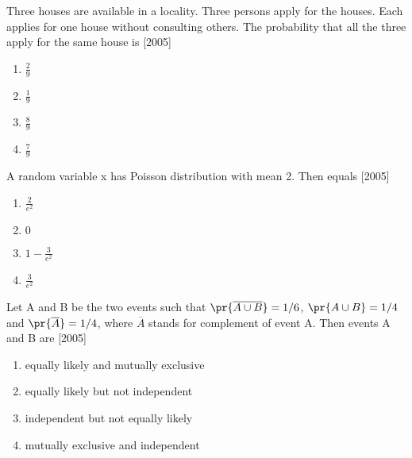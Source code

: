             \item Three houses are available in a locality. Three persons apply for the houses. Each applies for one house without consulting others. The probability that all the three apply for the same house is  \hfill [2005]

        \begin{multicols}{4}
        \begin{enumerate}
            \item $\frac{2}{9}$
            \item $\frac{1}{9}$
            \item $\frac{8}{9}$
            \item $\frac{7}{9}$   
        \end{enumerate}
        \end{multicols}



            \item A random variable x has Poisson distribution with mean 2. Then  equals \hfill [2005]

        \begin{multicols}{4}
        \begin{enumerate}
            \item $\frac{2}{e^2}$
            \item $0$
            \item $1 - \frac{3}{e^2}$
            \item $\frac{3}{e^2}$   
        \end{enumerate}
        \end{multicols}

        
            \item Let A and B be the two events such that $\pr{\overline{A \cup B}} = 1/6$, $\pr{A \cup B} = 1/4$ and $\pr{\overline{A}} = 1/4$, where $\overline{A}$ stands for complement of event A. Then events A and B are     \hfill [2005]

        
        \begin{enumerate}
            \item equally likely and mutually exclusive
            \item equally likely but not independent 
            \item independent but not equally likely
            \item mutually exclusive and independent 
        \end{enumerate}
        




